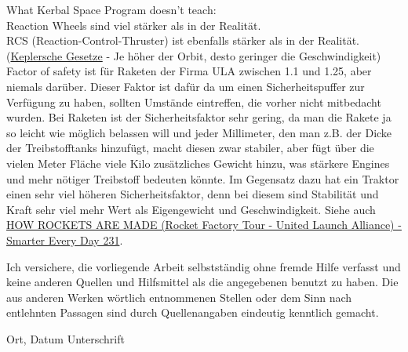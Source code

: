 \documentclass[12pt,paper=A4,numbers=noenddot,bibliography=totoc,listof=totoc,DIV=11,BCOR=1mm]{scrreprt}
\newcommand{\gq}[1]{\glqq #1\grqq} %
\begin{document}
What Kerbal Space Program doesn't teach:\\
Reaction Wheels sind viel stärker als in der Realität.\\
RCS (Reaction-Control-Thruster) ist ebenfalls stärker als in der Realität.\\

(\href{https://de.wikipedia.org/wiki/Keplersche_Gesetze}{Keplersche Gesetze} - Je höher der Orbit, desto geringer die Geschwindigkeit)\\

\gq{Factor of safety} ist für Raketen der Firma ULA zwischen 1.1 und 1.25, aber niemals darüber.
Dieser Faktor ist dafür da um einen Sicherheitspuffer zur Verfügung zu haben, sollten Umstände eintreffen,
die vorher nicht mitbedacht wurden. Bei Raketen ist der Sicherheitsfaktor sehr gering, da man
die Rakete ja so leicht wie möglich belassen will und jeder Millimeter, den man z.B. der Dicke
der Treibstofftanks hinzufügt, macht diesen zwar stabiler, aber fügt über die vielen Meter Fläche viele Kilo zusätzliches Gewicht hinzu, was stärkere Engines und mehr nötiger Treibstoff bedeuten könnte. Im Gegensatz dazu hat ein Traktor einen sehr viel höheren Sicherheitsfaktor, denn bei diesem sind Stabilität und Kraft sehr viel mehr Wert als Eigengewicht und Geschwindigkeit.
Siehe auch \href{https://youtu.be/o0fG_lnVhHw}{HOW ROCKETS ARE MADE (Rocket Factory Tour - United Launch Alliance) - Smarter Every Day 231}.



\listoffigures

\lstlistoflistings


\begin{thebibliography}{}  %
\end{thebibliography}

\clearpage
\begin{center}
	\colorbox{ghell}{%
		\parbox{0.8\linewidth}{
		Ich versichere, die vorliegende Arbeit selbstst\"andig ohne fremde Hilfe verfasst 
		und keine anderen Quellen und Hilfsmittel als die angegebenen benutzt zu haben. 
		Die aus anderen Werken w\"ortlich entnommenen Stellen oder dem Sinn nach 
		entlehnten Passagen sind durch Quellenangaben eindeutig kenntlich gemacht.
		\par\bigskip\bigskip\bigskip\bigskip
		\hspace*{0.8cm}Ort, Datum \hfill Unterschrift\hspace*{0.8cm}
		}
	}
\end{center}
\end{document}
